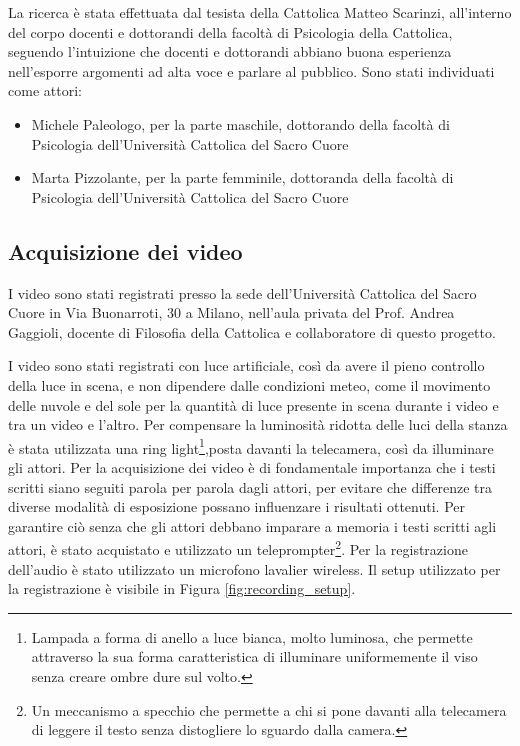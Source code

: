 La ricerca è stata effettuata dal tesista della Cattolica Matteo Scarinzi, all'interno del corpo docenti e dottorandi della facoltà di Psicologia della Cattolica, seguendo l'intuizione che docenti e dottorandi abbiano buona esperienza nell'esporre argomenti ad alta voce e parlare al pubblico. Sono stati individuati come attori:
\begin{itemize}
    \item Michele Paleologo, per la parte maschile, dottorando della facoltà di Psicologia dell'Università Cattolica del Sacro Cuore
    \item Marta Pizzolante, per la parte femminile, dottoranda della facoltà di Psicologia dell'Università Cattolica del Sacro Cuore
\end{itemize}

\subsection{Acquisizione dei video}

I video sono stati registrati presso la sede dell'Università Cattolica del Sacro Cuore in Via Buonarroti, 30 a Milano, nell'aula privata del Prof. Andrea Gaggioli, docente di Filosofia della Cattolica e collaboratore di questo progetto.

I video sono stati registrati con luce artificiale, così da avere il pieno controllo della luce in scena, e non dipendere dalle condizioni meteo, come il movimento delle nuvole e del sole per la quantità di luce presente in scena durante i video e tra un video e l'altro. Per compensare la luminosità ridotta delle luci della stanza è stata utilizzata una ring light\footnote{Lampada a forma di anello a luce bianca, molto luminosa, che permette attraverso la sua forma caratteristica di illuminare uniformemente il viso senza creare ombre dure sul volto.},posta davanti la telecamera, così da illuminare gli attori. Per la acquisizione dei video è di fondamentale importanza che i testi scritti siano seguiti parola per parola dagli attori, per evitare che differenze tra diverse modalità di esposizione possano influenzare i risultati ottenuti. Per garantire ciò senza che gli attori debbano imparare a memoria i testi scritti agli attori, è stato acquistato e utilizzato un teleprompter\footnote{Un meccanismo a specchio che permette a chi si pone davanti alla telecamera di leggere il testo senza distogliere lo sguardo dalla camera.}. Per la registrazione dell'audio è stato utilizzato un microfono lavalier wireless. Il setup utilizzato per la registrazione è visibile in Figura \ref{fig:recording_setup}.

